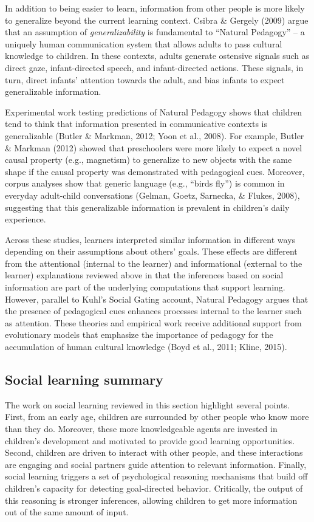 \documentclass[oneside]{report}
\begin{document}
In addition to being easier to learn, information from other people is
more likely to generalize beyond the current learning context. Csibra \&
Gergely (2009) argue that an assumption of \emph{generalizability} is
fundamental to ``Natural Pedagogy'' -- a uniquely human communication
system that allows adults to pass cultural knowledge to children. In
these contexts, adults generate ostensive signals such as direct gaze,
infant-directed speech, and infant-directed actions. These signals, in
turn, direct infants' attention towards the adult, and bias infants to
expect generalizable information.

Experimental work testing predictions of Natural Pedagogy shows that
children tend to think that information presented in communicative
contexts is generalizable (Butler \& Markman, 2012; Yoon et al., 2008).
For example, Butler \& Markman (2012) showed that preschoolers were more
likely to expect a novel causal property (e.g., magnetism) to generalize
to new objects with the same shape if the causal property was
demonstrated with pedagogical cues. Moreover, corpus analyses show that
generic language (e.g., ``birds fly'') is common in everyday adult-child
conversations (Gelman, Goetz, Sarnecka, \& Flukes, 2008), suggesting
that this generalizable information is prevalent in children's daily
experience.

Across these studies, learners interpreted similar information in
different ways depending on their assumptions about others' goals. These
effects are different from the attentional (internal to the learner) and
informational (external to the learner) explanations reviewed above in
that the inferences based on social information are part of the
underlying computations that support learning. However, parallel to
Kuhl's Social Gating account, Natural Pedagogy argues that the presence
of pedagogical cues enhances processes internal to the learner such as
attention. These theories and empirical work receive additional support
from evolutionary models that emphasize the importance of pedagogy for
the accumulation of human cultural knowledge (Boyd et al., 2011; Kline,
2015).

\hypertarget{social-learning-summary}{%
\subsection{Social learning summary}\label{social-learning-summary}}

The work on social learning reviewed in this section highlight several
points. First, from an early age, children are surrounded by other
people who know more than they do. Moreover, these more knowledgeable
agents are invested in children's development and motivated to provide
good learning opportunities. Second, children are driven to interact
with other people, and these interactions are engaging and social
partners guide attention to relevant information. Finally, social
learning triggers a set of psychological reasoning mechanisms that build
off children's capacity for detecting goal-directed behavior.
Critically, the output of this reasoning is stronger inferences,
allowing children to get more information out of the same amount of
input.
\end{document}
